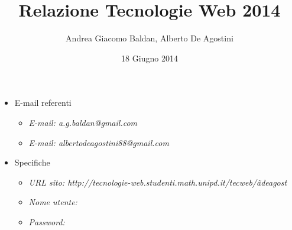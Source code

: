 \documentclass[a4paper, 12pt]{article}
\title{Relazione Tecnologie Web 2014}
\author{Andrea Giacomo Baldan, Alberto De Agostini}
\date{18 Giugno 2014}
\begin{document}
\maketitle

\begin{itemize}
\item E-mail referenti
  \begin{itemize}
  \item \emph{E-mail: a.g.baldan@gmail.com}
  \item \emph{E-mail: albertodeagostini88@gmail.com}
  \end{itemize}
\item Specifiche
  \begin{itemize}
  \item \emph{URL sito: http://tecnologie-web.studenti.math.unipd.it/tecweb/\~adeagost}
  \item \emph{Nome utente: }
  \item \emph{Password: }
  \end{itemize}
\end{itemize}








\end{document}
